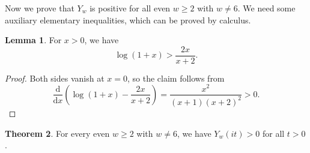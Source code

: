 \documentclass[10pt,reqno]{amsproc}
\newcommand{\dd}{\mathrm{d}}
\newcommand{\1}{\mathds{1}}	%
\theoremstyle{definition}
\newtheorem{theorem}{Theorem}[section]
\newtheorem{lemma}[theorem]{Lemma}
\theoremstyle{remark}
\begin{document}
Now we prove that $Y_w$ is positive for all even $w \ge 2$ with $w \ne 6$.
We need some auxiliary elementary inequalities, which can be proved by calculus.
\begin{lemma}
    \label{lem:logineq1}    
    For $x > 0$, we have
    \begin{equation}
        \label{eqn:logineq1}
        \log(1 + x) > \frac{2x}{x+2}.
    \end{equation}
\end{lemma}
\begin{proof}
    Both sides vanish at $x = 0$, so the claim follows from
    \[
        \frac{\dd}{\dd x} \left(\log(1+x) - \frac{2x}{x+2}\right) = \frac{x^2}{(x+1)(x+2)^2} > 0.
    \]
\end{proof}
\begin{theorem}
    \label{thm:Ywpos}
    For every even $w \ge 2$ with $w \ne 6$, we have $Y_w(it)>0$ for all $t>0$.
\end{theorem}
\end{document}
